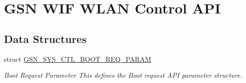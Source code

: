 \hypertarget{a00636}{
\section{GSN WIF WLAN Control API}
\label{a00636}
}
\subsection*{Data Structures}
\begin{DoxyCompactItemize}
\item 
struct \hyperlink{a00247}{GSN\_\-SYS\_\-CTL\_\-BOOT\_\-REQ\_\-PARAM}
\begin{DoxyCompactList}\small\item\em Boot Request Parameter This defines the Boot request API parameter structure. \end{DoxyCompactList}\end{DoxyCompactItemize}
